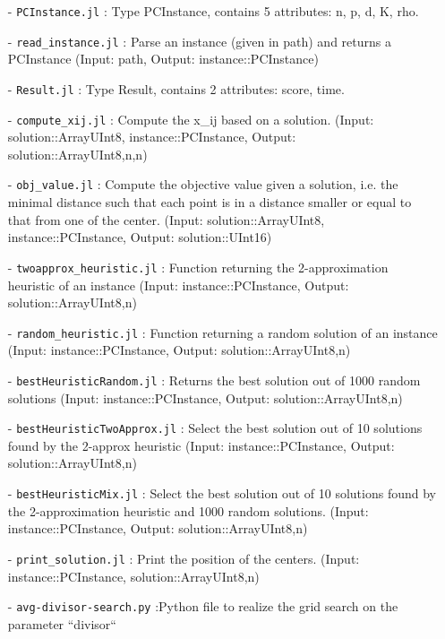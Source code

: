 \documentclass[a4paper,10pt]{article}
\begin{document}
\begin{itemize}
\item[-] \texttt{PCInstance.jl} : Type PCInstance, contains 5 attributes: n, p, d, K, rho.
\item[-] \texttt{read\_instance.jl} : Parse an instance (given in path) and returns a PCInstance (Input: path, Output: instance::PCInstance)

\item[-] \texttt{Result.jl} : Type Result, contains 2 attributes: score, time.

\item[-] \texttt{compute\_xij.jl} : Compute the x\_ij based on a solution. (Input: solution::Array{UInt8}, instance::PCInstance, Output: solution::Array{UInt8,n,n})

\item[-] \texttt{obj\_value.jl} : Compute the objective value given a solution, i.e. the minimal distance such that each point is in a distance smaller or equal to that from one of the center. (Input: solution::Array{UInt8}, instance::PCInstance, Output: solution::UInt16)

\item[-] \texttt{twoapprox\_heuristic.jl} : Function returning the 2-approximation heuristic of an instance (Input: instance::PCInstance, Output: solution::Array{UInt8,n})

\item[-] \texttt{random\_heuristic.jl} : Function returning a random solution of an instance (Input: instance::PCInstance, Output: solution::Array{UInt8,n})

\item[-] \texttt{bestHeuristicRandom.jl} : Returns the best solution out of 1000 random solutions (Input: instance::PCInstance, Output: solution::Array{UInt8,n})

\item[-] \texttt{bestHeuristicTwoApprox.jl} : Select the best solution out of 10 solutions found by the 2-approx heuristic (Input: instance::PCInstance, Output: solution::Array{UInt8,n})

\item[-] \texttt{bestHeuristicMix.jl} : Select the best solution out of 10 solutions found by the 2-approximation heuristic and 1000 random solutions. (Input: instance::PCInstance, Output: solution::Array{UInt8,n})

\item[-] \texttt{print\_solution.jl} : Print the position of the centers. (Input: instance::PCInstance, solution::Array{UInt8,n})

\item[-] \texttt{avg-divisor-search.py} :Python file to realize the grid search on the parameter ``divisor``

\end{itemize}
\end{document}
